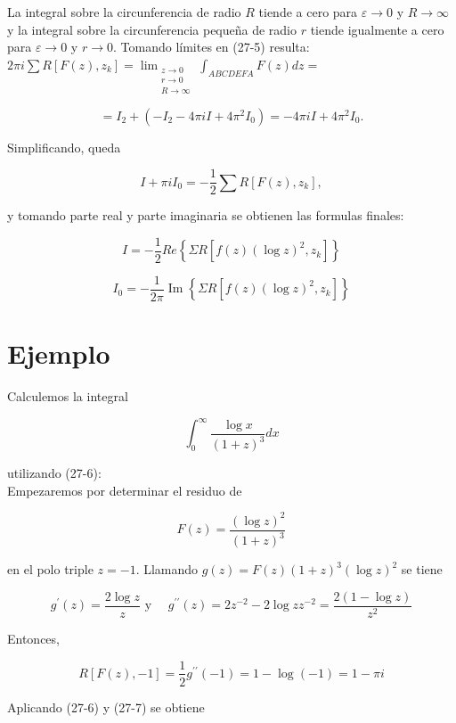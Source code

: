 \documentclass[10pt]{article}
\theoremstyle{plain}
\theoremstyle{definition}
\theoremstyle{remark}
\begin{document}
La integral sobre la circunferencia de radio $R$ tiende a cero para $\varepsilon \rightarrow 0$ y $R \rightarrow \infty$ y la integral sobre la circunferencia pequeña de radio $r$ tiende igualmente a cero para $\varepsilon \rightarrow 0$ y $r \rightarrow 0$. Tomando límites en (27-5) resulta:\\
$2 \pi i \sum R\left[F(z), z_{k}\right]=\lim _{\substack{z \rightarrow 0 \\ r \rightarrow 0 \\ R \rightarrow \infty}} \int_{A B C D E F A} F(z) d z=$

$$
=I_{2}+\left(-I_{2}-4 \pi i I+4 \pi^{2} I_{0}\right)=-4 \pi i I+4 \pi^{2} I_{0} .
$$

Simplificando, queda

$$
I+\pi i I_{0}=-\frac{1}{2} \sum R\left[F(z), z_{k}\right],
$$

y tomando parte real y parte imaginaria se obtienen las formulas finales:


\begin{equation*}
I=-\frac{1}{2} R e\left\{\Sigma R\left[f(z)(\log z)^{2}, z_{k}\right]\right\} \tag{27-6}
\end{equation*}



\begin{equation*}
I_{0}=-\frac{1}{2 \pi} \operatorname{Im}\left\{\Sigma R\left[f(z)(\log z)^{2}, z_{k}\right]\right\} \tag{27.7}
\end{equation*}


\section*{Ejemplo}
Calculemos la integral

$$
\int_{0}^{\infty} \frac{\log x}{(1+z)^{3}} d x
$$

utilizando (27-6):\\
Empezaremos por determinar el residuo de

$$
F(z)=\frac{(\log z)^{2}}{(1+z)^{3}}
$$

en el polo triple $z=-1$. Llamando $g(z)=F(z)(1+z)^{3}(\log z)^{2}$ se tiene

$$
g^{\prime}(z)=\frac{2 \log z}{z} \text { y } \quad g^{\prime \prime}(z)=2 z^{-2}-2 \log z z^{-2}=\frac{2(1-\log z)}{z^{2}}
$$

Entonces,

$$
R[F(z),-1]=\frac{1}{2} g^{\prime \prime}(-1)=1-\log (-1)=1-\pi i
$$

Aplicando (27-6) y (27-7) se obtiene
\end{document}
